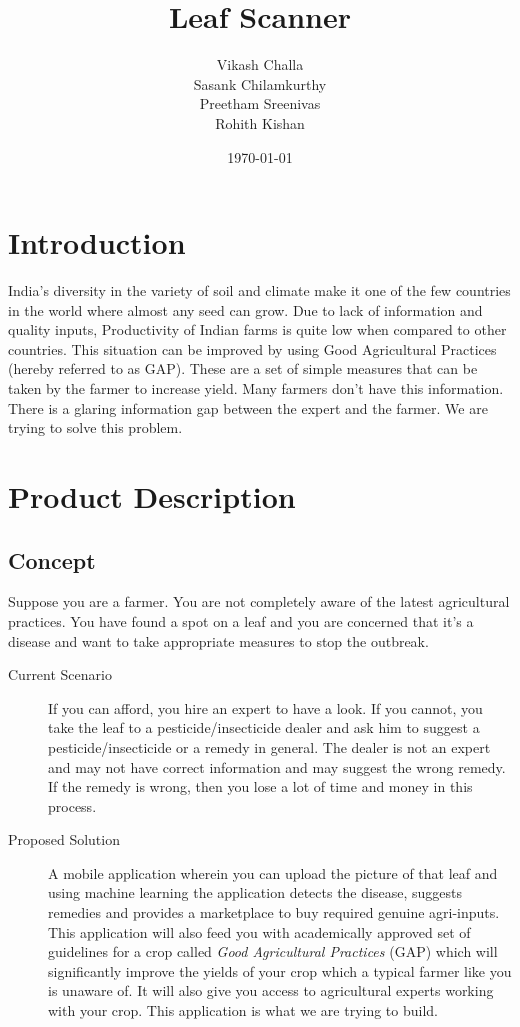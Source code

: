 \documentclass[a4paper]{article}
\begin{document}
\title{Leaf Scanner}
\author{Vikash Challa\\Sasank Chilamkurthy\\Preetham Sreenivas\\Rohith Kishan}
\date{\today}
\maketitle

\section{Introduction}
India's diversity in the variety of soil and climate make it one of the few countries in the world where almost any seed can grow. Due to lack of information and quality inputs, Productivity of Indian farms is quite low when compared to other countries. This situation can be improved by using Good Agricultural Practices (hereby referred to as GAP). These are a set of simple measures that can be taken by the farmer to increase yield. Many farmers don’t have this information. There is a glaring information gap between the expert and the farmer. We are trying to solve this problem. 

\section{Product Description}
\subsection{Concept}
Suppose you are a farmer. You are not completely aware of the latest agricultural practices. You have found a spot on a leaf and you are concerned that it’s a disease and want to take appropriate measures to stop the outbreak. 
\begin{description}
\item[Current Scenario] If you can afford, you hire an expert to have a look. If you cannot, you take the leaf to a pesticide/insecticide dealer and ask him to suggest a pesticide/insecticide or a remedy in general. The dealer is not an expert and may not have correct information and may suggest the wrong remedy. If the remedy is wrong, then you lose a lot of time and money in this process.

\item[Proposed Solution] A mobile application wherein you can upload the picture of that leaf and using machine learning the application detects the disease, suggests remedies and provides a marketplace to buy required genuine agri-inputs. 
This application will also feed you with academically approved set of guidelines for a crop called \emph{Good Agricultural Practices} (GAP) which will significantly improve the yields of your crop which a typical farmer like you is unaware of.
It will also give you access to agricultural experts working with your crop.
This application is what we are trying to build. 

\end{description}
	
\end{document}
